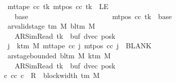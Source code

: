 \begin{isabellebody}
\ \ \ \ \ \ \ \ \ \ \ \ \ \ \ \ \ \ \ \ \ \ \ mt{\isacharunderscore}{\kern0pt}tape\ cc\ tk\ {\isacharparenleft}{\kern0pt}mt{\isacharunderscore}{\kern0pt}pos\ cc\ tk{\isacharparenright}{\kern0pt}\ {\isasymnoteq}\ LE{}{\isacharsemicolon}{\kern0pt}\isanewline
\ \ \ \ \ \ \ \ \ \ \ \ \ \ \ \ \ \ \ \ \ \ \ {}\ {\isacharless}{\kern0pt}\ base{\isacharprime}{\kern0pt}{\isacharsemicolon}{\kern0pt}\isanewline
\ \ \ \ \ \ \ \ \ \ \ \ \ \ \ \ \ \ \ \ \ \ \ mt{\isacharunderscore}{\kern0pt}pos\ cc\ tk\ {\isacharequal}{\kern0pt}\ base{\isacharprime}{\kern0pt}{\isacharsemicolon}{\kern0pt}\isanewline
\ \ \ \ \ \ \ \ \ \ \ \ \ \ \ \ \ \ \ \ \ \ \ ar{\isacharunderscore}{\kern0pt}valid{\isacharunderscore}{\kern0pt}stage\ {\isacharparenleft}{\kern0pt}{\isasymGamma}{\isacharunderscore}{\kern0pt}tm\ M{\isacharparenright}{\kern0pt}\ {\isacharparenleft}{\kern0pt}bl{\isacharunderscore}{\kern0pt}tm\ M{\isacharparenright}{\kern0pt}\isanewline
\ \ \ \ \ \ \ \ \ \ \ \ \ \ \ \ \ \ \ \ \ \ \ \ \ {\isacharparenleft}{\kern0pt}AR{\isacharunderscore}{\kern0pt}SimRead{\isacharcomma}{\kern0pt}\ tk{\isacharcomma}{\kern0pt}\ {}{\isacharcomma}{\kern0pt}\ buf{\isacharcomma}{\kern0pt}\ dvec{\isacharcomma}{\kern0pt}\ posk{\isacharparenright}{\kern0pt}{\isacharsemicolon}{\kern0pt}\isanewline
\ \ \ \ \ \ \ \ \ \ \ \ \ \ \ \ \ \ \ \ \ \ \ {\isasymforall}j\ {\isasymge}\ k{\isacharunderscore}{\kern0pt}tm\ M{\isachardot}{\kern0pt}\ mt{\isacharunderscore}{\kern0pt}tape\ cc\ j\ {\isacharparenleft}{\kern0pt}mt{\isacharunderscore}{\kern0pt}pos\ cc\ j{\isacharparenright}{\kern0pt}\ {\isacharequal}{\kern0pt}\ BLANK{}{\isacharsemicolon}{\kern0pt}\isanewline
\ \ \ \ \ \ \ \ \ \ \ \ \ \ \ \ \ \ \ \ \ \ \ ar{\isacharunderscore}{\kern0pt}stage{\isacharunderscore}{\kern0pt}bounded\ {\isacharparenleft}{\kern0pt}bl{\isacharunderscore}{\kern0pt}tm\ M{\isacharparenright}{\kern0pt}\ {\isacharparenleft}{\kern0pt}k{\isacharunderscore}{\kern0pt}tm\ M{\isacharparenright}{\kern0pt}\isanewline
\ \ \ \ \ \ \ \ \ \ \ \ \ \ \ \ \ \ \ \ \ \ \ \ \ {\isacharparenleft}{\kern0pt}AR{\isacharunderscore}{\kern0pt}SimRead{\isacharcomma}{\kern0pt}\ tk{\isacharcomma}{\kern0pt}\ {}{\isacharcomma}{\kern0pt}\ buf{\isacharcomma}{\kern0pt}\ dvec{\isacharcomma}{\kern0pt}\ posk{\isacharparenright}{\kern0pt}\ {\isasymrbrakk}\isanewline
\ \ \ \ \ \ \ \ \ \ \ \ \ \ \ \ \ \ \ \ \ {\isasymLongrightarrow}\ {\isasymexists}c{\isacharprime}{\kern0pt}{\isacharprime}{\kern0pt}{\isachardot}{\kern0pt}\ {\isacharparenleft}{\kern0pt}cc{\isacharcomma}{\kern0pt}\ c{\isacharprime}{\kern0pt}{\isacharprime}{\kern0pt}{\isacharparenright}{\kern0pt}\ {\isasymin}\ R{\isacharprime}{\kern0pt}\ {\isacharcircum}{\kern0pt}{\isacharcircum}{\kern0pt}\ {\isacharparenleft}{\kern0pt}block{\isacharunderscore}{\kern0pt}width\ {\isacharparenleft}{\kern0pt}{\isasymGamma}{\isacharunderscore}{\kern0pt}tm\ M{\isacharparenright}{\kern0pt}\ {\isacharplus}{\kern0pt}\ {}{\isacharparenright}{\kern0pt}\isanewline

\end{isabellebody}
